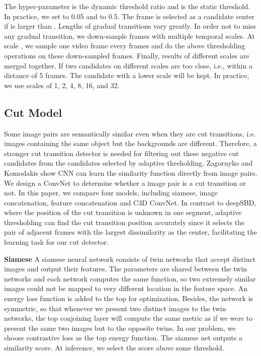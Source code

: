 \documentclass[runningheads]{llncs}
\begin{document}
 The hyper-parameter  is the dynamic threshold ratio and  is the static threshold. In practice, we set  to 0.05 and  to 0.5. The frame is selected as a candidate center if  is larger than . Lengths of gradual transitions vary greatly. In order not to miss any gradual transition, we down-sample frames with multiple temporal scales. At scale , we sample one video frame every  frames and do the above thresholding operations on these down-sampled frames. Finally, results of different scales are merged together. If two candidates on different scales are too close, i.e., within a distance of 5 frames. The candidate with a lower scale will be kept. In practice, we use scales of 1, 2, 4, 8, 16, and 32.

\subsection{Cut Model}\label{sec:1}
 Some image pairs are semantically similar even when they are cut transitions, i.e. images containing the same object but the backgrounds are different. Therefore, a stronger cut transition detector is needed for filtering out these negative cut candidates from the candidates selected by adaptive threholding. Zagoruyko and Komodakis\cite{zagoruyko2015learning} show CNN can learn the similarity function directly from image pairs. We design a ConvNet to determine whether a image pair is a cut transition or not. In this paper, we compare four models, including siamese, image concatenation, feature concatenation and C3D ConvNet. In contrast to deepSBD, where the position of the cut transition is unknown in one segment, adaptive thresholding can find the cut transition position accurately since it selects the pair of adjacent frames with the largest dissimilarity as the center, facilitating the learning task for our cut detector.

\textbf{Siamese} A siamese neural network consists of twin networks that accept distinct images and output their features. The parameters are shared between the twin networks and each network computes the same function, so two extremely similar images could not be mapped to very different location in the feature space. An energy loss function is added to the top for optimization. Besides, the network is symmetric, so that whenever we present two distinct images to the twin networks, the top conjoining layer will compute the same metric as if we were to present the same two images but to the opposite twins. In our problem, we choose contrastive loss as the top energy function. The siamese net outputs a similarity score. At inference, we select the score above some threshold. 
\end{document}
